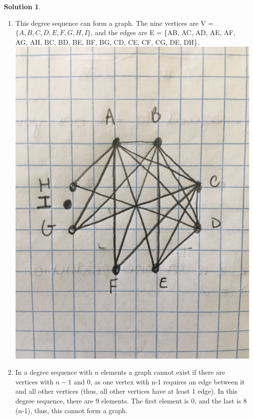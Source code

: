 \documentclass{article}
\theoremstyle{definition}
\newtheorem*{solution}{Solution}
\begin{document}
\begin{solution}
\end{solution}
\begin{enumerate}[label = \alph*)]
    \item This degree sequence can form a graph. The nine vertices are V =  $\{A, B, C, D, E, F, G, H, I\}$, and the edges are E = \{AB, AC, AD, AE, AF, AG, AH, BC, BD, BE, BF, BG, CD, CE, CF, CG, DE, DH\}.\\
    \includegraphics[scale=.05, angle = 270]{IMG_2708.JPG}
    
    \item In a degree sequence with $n$ elements a graph cannot exist if there are vertices with $n-1$ and 0, as one vertex with n-1 requires an edge between it and all other vertices (thus, all other vertices have at least 1 edge). In this degree sequence, there are 9 elements. The first element is 0, and the last is 8 (n-1), thus, this cannot form a graph.
    

\end{enumerate}
\end{document}
